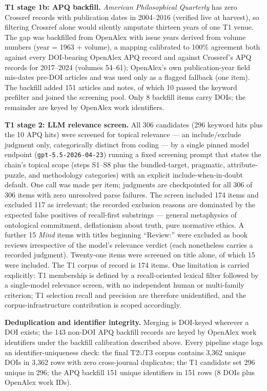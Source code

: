 \textbf{T1 stage 1b: APQ backfill.} \emph{American Philosophical Quarterly} has zero Crossref records with publication dates in 2004--2016 (verified live at harvest), so filtering Crossref alone would silently amputate thirteen years of one T1 venue. The gap was backfilled from OpenAlex with issue years derived from volume numbers (year = 1963 + volume), a mapping calibrated to 100\% agreement both against every DOI-bearing OpenAlex APQ record and against Crossref's APQ records for 2017--2024 (volumes 54--61); OpenAlex's own publication-year field mis-dates pre-DOI articles and was used only as a flagged fallback (one item). The backfill added 151 articles and notes, of which 10 passed the keyword prefilter and joined the screening pool. Only 8 backfill items carry DOIs; the remainder are keyed by OpenAlex work identifiers.

\textbf{T1 stage 2: LLM relevance screen.} All 306 candidates (296 keyword hits plus the 10 APQ hits) were screened for topical relevance --- an include/exclude judgment only, categorically distinct from coding --- by a single pinned model endpoint (\texttt{gpt-5.5-2026-04-23}) running a fixed screening prompt that states the chain's topical scope (steps S1--S8 plus the bundled-target, pragmatic, attribute-puzzle, and methodology categories) with an explicit include-when-in-doubt default. One call was made per item; judgments are checkpointed for all 306 of 306 items with zero unresolved parse failures. The screen included 174 items and excluded 117 as irrelevant; the recorded exclusion reasons are dominated by the expected false positives of recall-first substrings --- general metaphysics of ontological commitment, deflationism about truth, pure normative ethics. A further 15 \emph{Mind} items with titles beginning ``Review:'' were excluded as book reviews irrespective of the model's relevance verdict (each nonetheless carries a recorded judgment). Twenty-one items were screened on title alone, of which 15 were included. The T1 corpus of record is 174 items. One limitation is carried explicitly: T1 membership is defined by a recall-oriented lexical filter followed by a single-model relevance screen, with no independent human or multi-family criterion; T1 selection recall and precision are therefore unidentified, and the corpus-infrastructure contribution is scoped accordingly.

\textbf{Deduplication and identifier integrity.} Merging is DOI-keyed wherever a DOI exists; the 143 non-DOI APQ backfill records are keyed by OpenAlex work identifiers under the backfill calibration described above. Every pipeline stage logs an identifier-uniqueness check: the final T2$\cup$T3 corpus contains 3,362 unique DOIs in 3,362 rows with zero cross-journal duplicates; the T1 candidate set 296 unique in 296; the APQ backfill 151 unique identifiers in 151 rows (8 DOIs plus OpenAlex work IDs).

